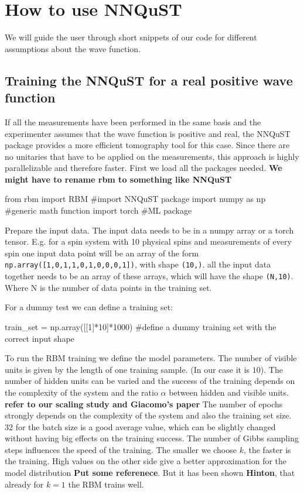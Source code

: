 \documentclass[submission, Phys]{SciPost}
\begin{document}
\section{How to use NNQuST}

We will guide the user through short snippets of our code for different assumptions about the wave function.

\subsection{Training the NNQuST for a real positive wave function}

If all the measurements have been performed in the same basis and the experimenter assumes that the wave function is positive and real, the NNQuST package provides a more efficient tomography tool for this case. Since there are no unitaries that have to be applied on the measurements, this approach is highly parallelizable  and therefore faster.
First we load all the packages needed. \textbf{We might have to rename rbm to something like NNQuST} 

\begin{python}
from rbm import RBM #import NNQuST package
import numpy as np #generic math function
import torch #ML package
\end{python}

Prepare the input data. The input data needs to be in a numpy array or a torch tensor. E.g. for a spin system with 10 physical spins and measurements of every spin one input data point will be an array of the form \verb|np.array([1,0,1,1,0,1,0,0,0,1])|, with shape \verb|(10,)|. all the input data together needs to be an array of these arrays, which will have the shape \verb|(N,10)|. Where N is the number of data points in the training set.

For a dummy test we can define a training set:

\begin{python}
train_set = np.array([[1]*10]*1000) #define a dummy training set with the correct input shape
\end{python}

To run the RBM training we define the model parameters. The number of visible units is given by the length of one training sample. (In our case it is $10$). 
The number of hidden units can be varied and the success of the training depends on the complexity of the system and the ratio $\alpha$ between hidden and visible units. 
\textbf{refer to our scaling study and Giacomo's paper} 
The number of epochs strongly depends on the complexity of the system and also the training set size. 32 for the batch size is a good average value, which can be slightly changed without having big effects on the training success. The number of Gibbs sampling steps influences the speed of the training. The smaller we choose $k$, the faster is the training. High values on the other side give a better approximation for the model distribution \textbf{Put some referenece}. But it has been shown \textbf{Hinton}, that already for $k=1$ the RBM trains well.
\end{document}
